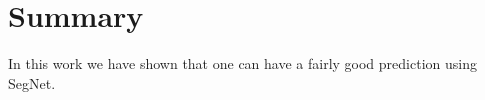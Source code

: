 \documentclass[10pt,conference,compsocconf]{IEEEtran}
\begin{document}
\section{Summary}
In this work we have shown that one can have a fairly good prediction using SegNet.



%
%




\end{document}
